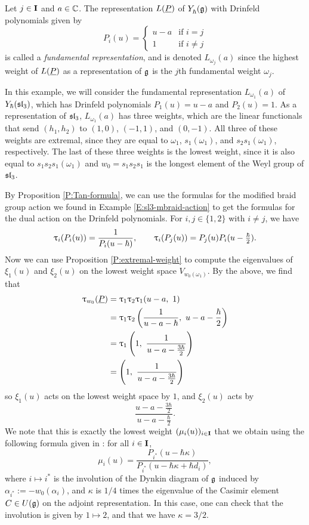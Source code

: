 \begin{example}\label{E:dual-braid-sl3}
    Let $j\in\mathbf{I}$ and $a\in\mathbb{C}$.
    The representation $L(\underline{P})$ of $Y_\hbar^{}(\mathfrak{g})$ with Drinfeld polynomials given by
    \[P_i(u) =
    \begin{cases}
        u-a & \text{if } i=j \\
        1 & \text{if } i\neq j
    \end{cases}\]
    is called a \emph{fundamental representation}, and is denoted $L_{\omega_j}(a)$ since the highest weight of $L(\underline{P})$ as a representation of $\mathfrak{g}$ is the $j$th fundamental weight $\omega_j$.

    In this example, we will consider the fundamental representation $L_{\omega_1}(a)$ of $Y_\hbar(\mathfrak{sl}_3)$, which has Drinfeld polynomials $P_1(u) = u-a$ and $P_2(u) = 1$.
    As a representation of $\mathfrak{sl}_3$, $L_{\omega_1}(a)$ has three weights, which are the linear functionals that send $(h_1,h_2)$ to $(1,0)$, $(-1,1)$, and $(0,-1)$.
    All three of these weights are extremal, since they are equal to $\omega_1$, $s_1(\omega_1)$, and $s_2s_1(\omega_1)$, respectively.
    The last of these three weights is the lowest weight, since it is also equal to $s_1s_2s_1(\omega_1)$ and $w_0 = s_1s_2s_1$ is the longest element of the Weyl group of $\mathfrak{sl}_3$.

    By Proposition \ref{P:Tan-formula}, we can use the formulas for the modified braid group action we found in Example \ref{E:sl3-mbraid-action} to get the formulas for the dual action on the Drinfeld polynomials.
    For $i,j\in\{1,2\}$ with $i\neq j$, we have
    \[\uptau_i(P_i(u)) = \frac{1}{P_i(u-\hbar)}, \qquad \uptau_i(P_j(u)) = P_j(u)P_i(u-\tfrac{\hbar}{2}).\]
    Now we can use Proposition \ref{P:extremal-weight} to compute the eigenvalues of $\xi_1(u)$ and $\xi_2(u)$ on the lowest weight space $V_{w_0(\omega_1)}$.
    By the above, we find that
    \begin{align*}
        \braid_{w_0}(\uP) & = \braid_1\braid_2\braid_1(u-a,\ 1) \\
        &= \braid_1\braid_2\left(\frac{1}{u-a-\hbar},\ u-a-\frac{\hbar}{2}\right) \\
        &= \braid_1\left(1,\ \frac{1}{u-a-\frac{3\hbar}{2}}\right) \\
        &= \left(1,\ \frac{1}{u-a-\frac{3\hbar}{2}}\right)
    \end{align*}
    so $\xi_1(u)$ acts on the lowest weight space by $1$, and $\xi_2(u)$ acts by
    \[\frac{u-a-\frac{3\hbar}{2}}{u-a-\frac{\hbar}{2}}.\]
    We note that this is exactly the lowest weight $(\mu_i(u))_{i\in\mathbf{I}}$ that we obtain using the following formula given in \cite[Prop. 3.5]{gautam_poles_2023}: for all $i\in\mathbf{I}$,
    \[\mu_i(u) = \frac{P_{i^*}(u-\hbar\kappa)}{P_{i^*}(u-\hbar\kappa+\hbar d_i)},\]
    where $i\mapsto i^*$ is the involution of the Dynkin diagram of $\mathfrak{g}$ induced by $\alpha_{i^*} := -w_0(\alpha_i)$, and $\kappa$ is $1/4$ times the eigenvalue of the Casimir element $C\in U(\mathfrak{g})$ on the adjoint representation.
    In this case, one can check that the involution is given by $1\mapsto 2$, and that we have $\kappa = 3/2$.
\end{example}
